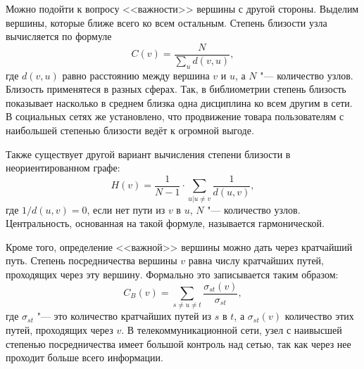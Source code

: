 Можно подойти к вопросу <<важности>> вершины с другой стороны. Выделим вершины, которые ближе всего ко всем остальным. Степень близости узла вычисляется по формуле
\begin{equation*}
    C(v) = \frac{N}{\sum_u{d(v,u)}},
\end{equation*}
где $d(v,u)$ равно расстоянию между вершина $v$ и $u$, а $N$ "--- количество узлов. Близость применятеся в разных сферах. Так, в библиометрии степень близость показывает насколько в среднем близка одна дисциплина ко всем другим в сети\cite{bibliometrics}. В социальных сетях же установлено, что продвижение товара пользователям с наибольшей степенью близости ведёт к огромной выгоде\cite{closeness_marketing}.

Также существует другой вариант вычисления степени близости в неориентированном графе:
\begin{equation*}
    H(v) = \frac{1}{N - 1} \cdot  \sum_{u\vert u \neq v}{\frac{1}{d(u,v)}},
\end{equation*}
где $1/d(u,v) = 0$, если нет пути из $v$ в $u$, $N$ "--- количество узлов. Центральность, основанная на такой формуле, называется гармонической.

Кроме того, определение <<важной>> вершины можно дать через кратчайший путь. Степень посредничества вершины $v$ равна числу кратчайших путей, проходящих через эту вершину. Формально это записывается таким образом:
\begin{equation*}
    C_B(v) = \sum_{s \neq u \neq t }{\frac{\sigma_{st}(v) }{\sigma_{st}}},
\end{equation*}
где $\sigma_{st}$ "--- это количество кратчайших путей из $s$ в $t$, а $\sigma_{st}(v)$ количество этих путей, проходящих через $v$. В телекоммуникационной сети, узел с наивысшей степенью посредничества имеет большой контроль над сетью, так как через нее проходит больше всего информации.
